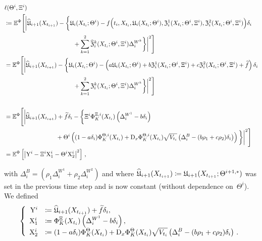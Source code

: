 \begin{small}
\begin{align*}
    &\ell(\Theta^i, \Xi^i) \\ &\defEqual \EE^\Phi\Bigg[\bigg|\widehat\Uf_{i+1}(X_{t_{i+1}})-\bigg\{\Uf_i(X_{t_i}; \Theta^i)-f\Big(t_{i}, X_{t_{i}}, \Uf_i(X_{t_i}; \Theta^i), \Zf^1_i(X_{t_i}; \Theta^i, \Xi^i), \Zf^2_i(X_{t_i}; \Theta^i, \Xi^i)\Big)\Deli \\
    & \hspace{4cm} + \sum_{k=1}^2\widehat \Zf^k_i(X_{t_i}; \Theta^i, \Xi^i)\Delta^{W^k}_{i}\bigg\}\bigg|^2\Bigg] \\
    &= \EE^\Phi\Bigg[\bigg|\widehat\Uf_{i+1}(X_{t_{i+1}})-\bigg\{\Uf_i(X_{t_i}; \Theta^i)-\left(a\Uf_i(X_{t_i}; \Theta^i) + b\Zf^1_i(X_{t_i}; \Theta^i, \Xi^i) + c\Zf^2_i(X_{t_i}; \Theta^i, \Xi^i) + \widetilde{f}\right)\Deli \\
    & \hspace{4cm} + \sum_{k=1}^2\Zf^k_i(X_{t_i}; \Theta^i, \Xi^i)\Delta^{W^k}_{i}\bigg\}\bigg|^2\Bigg] \\ \\
    &= \EE^\Phi\Bigg[\bigg|\widehat\Uf_{i+1}(X_{t_{i+1}}) + \widetilde{f}\Deli  - \bigg\{ \Xi^i\Phi_K^{\Xi,i}(X_{t_i})\left(\Delta^{W^1}_{i}-b\Deli \right) \\
    & \hspace{3cm} + \Theta^i\left((1-a\Deli )\Phi_K^{\Theta,i}(X_{t_i}) + \Dx\Phi_K^{\Theta,i}(X_{t_i})\sqrt{V_{t_i}}\left(\Delta^{B}_{i} - (b\rho_1 + c\rho_2)\Deli \right) \right) \bigg\}\bigg|^2\Bigg] \\
    &= \EE^\Phi\left[\left|\Y^i - \Xi^i \X_1^i -
    \Theta^i\X_2^i \right|^2\right]\,,
\end{align*}
\end{small}%
\endgroup
with $\Delta^{B}_{i}=(\rho_1\Delta^{W^1}_{i} + \rho_2\Delta^{W^2}_{i})$ and where $\widehat{\mathfrak{U}}_{i+1}(X_{t_{i+1}})\coloneqq \mathfrak{U}_{i+1}(X_{t_{i+1}}; \Theta^{i+1,*})$ was set in the previous time step and is now constant (without dependence on~$\Theta^i$). We defined
\begin{equation}\label{eq:SystemNonMark}
\left\{
\begin{array}{rl}
\mathrm{Y}^i & \coloneqq  \displaystyle \widehat{\mathfrak{U}}_{i+1}(X_{t_{i+1}}) + \widetilde{f}\delta_{i} , \\
     \mathrm{X}_1^i &\coloneqq  \displaystyle \Phi_K^\Xi(X_{t_i})\left(\Delta^{W^1}_{i}-b\delta_{i} \right), \\ 
    \mathrm{X}_2^i &\coloneqq  \displaystyle (1-a\delta_{i} )\Phi_K^\Theta(X_{t_i}) + \mathrm{D}_{x}\Phi_K^\Theta(X_{t_i})
    \sqrt{V_{t_i}}\left(\Delta^{B}_{i}-(b\rho_1 + c\rho_2)\delta_{i} \right)\,.
\end{array}
\right.
\end{equation}

